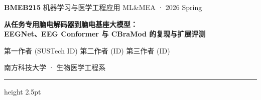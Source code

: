 \documentclass[12pt, a0paper]{article}
\begin{document}
\begin{center}
    {\fontsize{24}{30}\selectfont\bfseries\color{myorange}BMEB215}
    {\fontsize{20}{28}\selectfont\color{myteal} \hspace{0.5em} 机器学习与医学工程应用}
    \hspace{2em}
    {\fontsize{18}{24}\selectfont\color{myteal!70} ML\&MEA · 2026 Spring}

    \vspace{12mm}

    {\fontsize{52}{62}\selectfont\bfseries\color{myteal}
        从任务专用脑电解码器到脑电基座大模型：\\[3mm]
        EEGNet、EEG Conformer 与 CBraMod 的复现与扩展评测
    }

    \vspace{10mm}

    {\fontsize{26}{34}\selectfont\color{myteal!80}
        第一作者 (SUSTech ID)\hspace{2em} 第二作者 (ID)\hspace{2em} 第三作者 (ID)
    }

    \vspace{4mm}

    {\fontsize{20}{28}\selectfont\color{mygray}
        南方科技大学 · 生物医学工程系
    }

    \vspace{8mm}
    {\color{myteal}\hrule height 2.5pt}
    \vspace{6mm}
\end{center}
\end{document}
